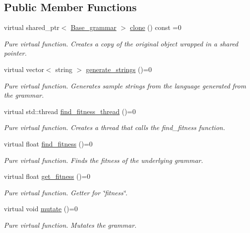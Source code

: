 \subsection*{Public Member Functions}
\begin{DoxyCompactItemize}
\item 
virtual shared\+\_\+ptr$<$ \mbox{\hyperlink{classBase__grammar}{Base\+\_\+grammar}} $>$ \mbox{\hyperlink{classBase__grammar_a46bdb324d10ba87d7faf654e8d041b38}{clone}} () const =0
\begin{DoxyCompactList}\small\item\em Pure virtual function. Creates a copy of the original object wrapped in a shared pointer. \end{DoxyCompactList}\item 
virtual vector$<$ string $>$ \mbox{\hyperlink{classBase__grammar_a19197d28ad3c12d15cd97a8d10832dda}{generate\+\_\+strings}} ()=0
\begin{DoxyCompactList}\small\item\em Pure virtual function. Generates sample strings from the language generated from the grammar. \end{DoxyCompactList}\item 
virtual std\+::thread \mbox{\hyperlink{classBase__grammar_ae89dff40e2380073bfd9f8ca8f5579f7}{find\+\_\+fitness\+\_\+thread}} ()=0
\begin{DoxyCompactList}\small\item\em Pure virtual function. Creates a thread that calls the find\+\_\+fitness function. \end{DoxyCompactList}\item 
virtual float \mbox{\hyperlink{classBase__grammar_a4a302ebcebff2c63ff92eed93cfb5323}{find\+\_\+fitness}} ()=0
\begin{DoxyCompactList}\small\item\em Pure virtual function. Finds the fitness of the underlying grammar. \end{DoxyCompactList}\item 
virtual float \mbox{\hyperlink{classBase__grammar_a8fb451c59454f03cfc0fb4a676894a39}{get\+\_\+fitness}} ()=0
\begin{DoxyCompactList}\small\item\em Pure virtual function. Getter for \char`\"{}fitness\char`\"{}. \end{DoxyCompactList}\item 
virtual void \mbox{\hyperlink{classBase__grammar_a0149287d3e0be2f7fd3657f1c30ac62d}{mutate}} ()=0
\begin{DoxyCompactList}\small\item\em Pure virtual function. Mutates the grammar. \end{DoxyCompactList}\item 

\end{DoxyCompactItemize}

